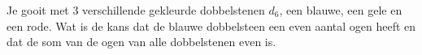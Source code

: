\documentclass[12pt]{article}
\begin{document}
Je gooit met 3 verschillende gekleurde dobbelstenen $d_6$, een blauwe, een gele en een rode. Wat is de kans dat de blauwe dobbelsteen een even aantal ogen heeft en dat de som van de ogen van alle dobbelstenen even is.
\end{document}
